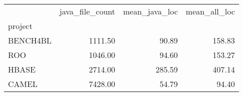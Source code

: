 \begin{tabular}{lrrr}
\toprule
{} &  java\_file\_count &  mean\_java\_loc &  mean\_all\_loc \\
project  &                  &                &               \\
\midrule
BENCH4BL &          1111.50 &          90.89 &        158.83 \\
ROO      &          1046.00 &          94.60 &        153.27 \\
HBASE    &          2714.00 &         285.59 &        407.14 \\
CAMEL    &          7428.00 &          54.79 &         94.40 \\
\bottomrule
\end{tabular}
